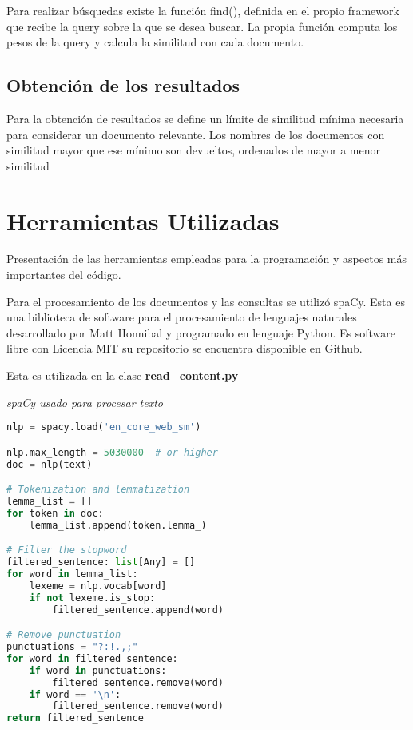 \documentclass[runningheads,a4paper]{llncs}
\begin{document}
Para realizar búsquedas existe la función find(), definida en el propio framework que recibe la query sobre la que se desea buscar.
La propia función computa los pesos de la query y calcula la similitud con cada documento.

\subsection{Obtención de los resultados}\label{subsec:obtención-de-los-resultados}
Para la obtención de resultados se define un límite de similitud mínima necesaria para considerar un documento relevante.
Los nombres de los documentos con similitud mayor que ese mínimo son devueltos, ordenados de mayor a menor similitud


\section{Herramientas Utilizadas}\label{sec:herramientas-utilizadas}
Presentación de las herramientas empleadas para la programación y aspectos más importantes del código.

Para el procesamiento de los documentos y las consultas se utilizó spaCy. Esta es una biblioteca de software para el procesamiento de lenguajes naturales desarrollado por Matt Honnibal y programado en lenguaje Python.
Es software libre con Licencia MIT su repositorio se encuentra disponible en Github.

Esta es utilizada en la clase \textbf{read\_content.py}


\medskip
\noindent
{\it spaCy usado para procesar texto}

\begin{lstlisting}[language=Python,label={lst:lstlisting}]
nlp = spacy.load('en_core_web_sm')

nlp.max_length = 5030000  # or higher
doc = nlp(text)

# Tokenization and lemmatization
lemma_list = []
for token in doc:
	lemma_list.append(token.lemma_)

# Filter the stopword
filtered_sentence: list[Any] = []
for word in lemma_list:
	lexeme = nlp.vocab[word]
	if not lexeme.is_stop:
		filtered_sentence.append(word)

# Remove punctuation
punctuations = "?:!.,;"
for word in filtered_sentence:
	if word in punctuations:
		filtered_sentence.remove(word)
	if word == '\n':
		filtered_sentence.remove(word)
return filtered_sentence
\end{lstlisting}
\end{document}
